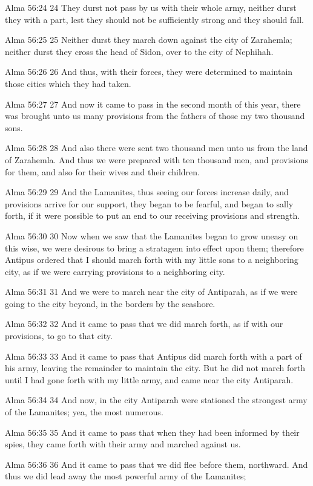 Alma 56:24
 24 They durst not pass by us with their whole army, neither
durst they with a part, lest they should not be sufficiently
strong and they should fall.

Alma 56:25
 25 Neither durst they march down against the city of Zarahemla;
neither durst they cross the head of Sidon, over to the city of
Nephihah.

Alma 56:26
 26 And thus, with their forces, they were determined to maintain
those cities which they had taken.

Alma 56:27
 27 And now it came to pass in the second month of this year,
there was brought unto us many provisions from the fathers of
those my two thousand sons.

Alma 56:28
 28 And also there were sent two thousand men unto us from the
land of Zarahemla. And thus we were prepared with ten thousand
men, and provisions for them, and also for their wives and their
children.

Alma 56:29
 29 And the Lamanites, thus seeing our forces increase daily, and
provisions arrive for our support, they began to be fearful, and
began to sally forth, if it were possible to put an end to our
receiving provisions and strength.

Alma 56:30
 30 Now when we saw that the Lamanites began to grow uneasy on
this wise, we were desirous to bring a stratagem into effect upon
them; therefore Antipus ordered that I should march forth with my
little sons to a neighboring city, as if we were carrying
provisions to a neighboring city.

Alma 56:31
 31 And we were to march near the city of Antiparah, as if we
were going to the city beyond, in the borders by the seashore.

Alma 56:32
 32 And it came to pass that we did march forth, as if with our
provisions, to go to that city.

Alma 56:33
 33 And it came to pass that Antipus did march forth with a part
of his army, leaving the remainder to maintain the city. But he
did not march forth until I had gone forth with my little army,
and came near the city Antiparah.

Alma 56:34
 34 And now, in the city Antiparah were stationed the strongest
army of the Lamanites; yea, the most numerous.

Alma 56:35
 35 And it came to pass that when they had been informed by their
spies, they came forth with their army and marched against us.

Alma 56:36
 36 And it came to pass that we did flee before them, northward.
And thus we did lead away the most powerful army of the
Lamanites;

